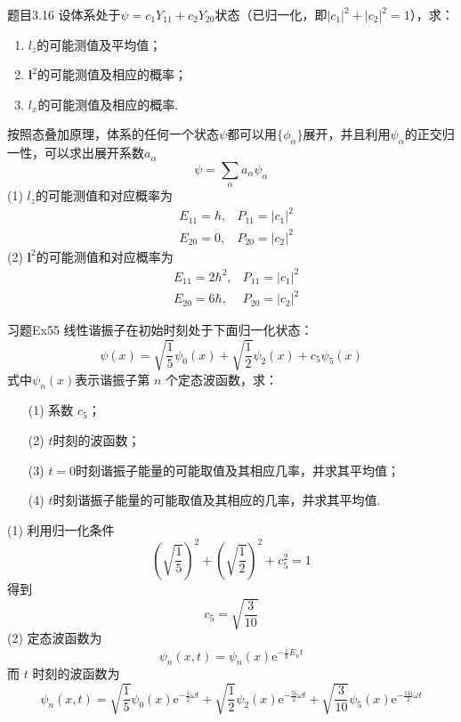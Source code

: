 \begin{question}{题目3.16}
    设体系处于$\psi=c_1Y_{11}+c_2Y_{20}$状态（已归一化，即$|c_1|^2+|c_2|^2=1$），求：
    \begin{enumerate}
        \item $l_z$的可能测值及平均值；
        \item $\boldsymbol{l}^2$的可能测值及相应的概率；
        \item $l_x$的可能测值及相应的概率.
    \end{enumerate}
\end{question}
\begin{solution}
    按照态叠加原理，体系的任何一个状态$\psi$都可以用$\{\phi_{\alpha}\}$展开，并且利用$\psi_{\alpha}$的正交归一性，可以求出展开系数$a_{\alpha}$
    $$
        \psi = \sum_{\alpha} a_{\alpha}\psi_{\alpha}
    $$
    (1) $l_z$的可能测值和对应概率为
    $$
        \begin{aligned}
             & E_{11} = \hbar, & P_{11} = |c_1|^2 \\
             & E_{20} = 0,     & P_{20} = |c_2|^2
        \end{aligned}
    $$
    (2) $\boldsymbol{l}^2$的可能测值和对应概率为
    $$
        \begin{aligned}
             & E_{11} = 2\hbar^2, & P_{11} = |c_1|^2 \\
             & E_{20} = 6\hbar,   & P_{20} = |c_2|^2
        \end{aligned}
    $$
\end{solution}





\begin{question}{习题Ex55}
    线性谐振子在初始时刻处于下面归一化状态：
    $$
        \psi(x) = \sqrt{\frac{1}{5}}\psi_0(x) + \sqrt{\frac{1}{2}}\psi_2(x) + c_5\psi_5(x)
    $$
    式中$\psi_n(x)$表示谐振子第 $n$ 个定态波函数，求：
    \begin{enumerate}
        \item[(1)] 系数 $c_5$；
        \item[(2)] $t$时刻的波函数；
        \item[(3)] $t=0$时刻谐振子能量的可能取值及其相应几率，并求其平均值；
        \item[(4)] $t$时刻谐振子能量的可能取值及其相应的几率，并求其平均值.
    \end{enumerate}
\end{question}
\begin{solution}
    (1) 利用归一化条件
    $$
        \left(\sqrt{\frac{1}{5}}\right)^2 + \left(\sqrt{\frac{1}{2}}\right)^2 + c_5^2 = 1
    $$
    得到
    $$
        c_5 = \sqrt{\frac{3}{10}}
    $$
    (2) 定态波函数为
    $$
        \psi_n(x, t) = \psi_n(x)\mathrm{e}^{-\frac{\mathrm{i}}{\hbar}E_nt}
    $$
    而 $t$ 时刻的波函数为
    $$
        \psi_n(x, t) = \sqrt{\frac{1}{5}}\psi_0(x)\mathrm{e}^{-\frac{\mathrm{i}}{2}\omega t} + \sqrt{\frac{1}{2}}\psi_2(x)\mathrm{e}^{-\frac{5\mathrm{i}}{2}\omega t} + \sqrt{\frac{3}{10}}\psi_5(x)\mathrm{e}^{-\frac{11\mathrm{i}}{2}\omega t}
    $$
\end{solution}

